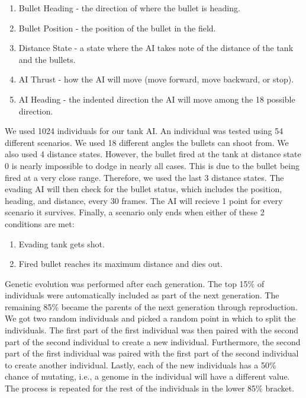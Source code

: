 \documentclass{acm_proc_article-sp}
\begin{document}
\begin{enumerate}
 \item Bullet Heading - the direction of where the bullet is heading.
 \item Bullet Position - the position of the bullet in the field.
 \item Distance State - a state where the AI takes note of the distance 
of the tank and the bullets.
 \item AI Thrust - how the AI will move (move forward, move backward, or stop).
 \item AI Heading - the indented direction the AI will move among the 18
possible direction.
\end{enumerate}

We used 1024 individuals for our tank AI. An individual was tested using 54 different
scenarios. We used 18 different angles the bullets can shoot from. We also used 4
distance states. However, the bullet fired at the tank at distance state 0 is nearly
impossible to dodge in nearly all cases. This is due to the bullet being fired at a 
very close range. Therefore, we used the last 3 distance states. The evading AI will
then check for the bullet status, which includes the position, heading, and distance,
every 30 frames. The AI will recieve 1 point for every scenario it survives. Finally,
a scenario only ends when either of these 2 conditions are met:

\begin{enumerate}
 \item Evading tank gets shot.
 \item Fired bullet reaches its maximum distance and dies out.
\end{enumerate}

Genetic evolution was performed after each generation. The top 15\% of individuals
were automatically included as part of the next generation. The remaining 85\% became
the parents of the next generation through reproduction. We got two random individuals
and picked a random point in which to split the individuals. The first part of the 
first individual was then paired with the second part of the second individual to 
create a new individual. Furthermore, the second part of the first individual was
paired with the first part of the second individual to create another individual.
Lastly, each of the new individuals has a 50\% chance of mutating, i.e., a genome
in the individual will have a different value. The process is repeated for the
rest of the individuals in the lower 85\% bracket.
\end{document}
